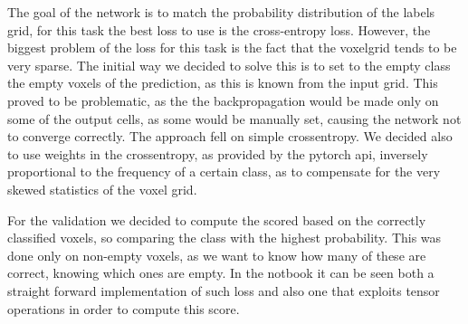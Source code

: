 The goal of the network is to match the probability distribution of the labels grid, for this task
the best loss to use is the cross-entropy loss. However, the biggest problem of the loss for this 
task is the fact that the voxelgrid tends to be very sparse. The initial way we decided to solve
this is to set to the empty class the empty voxels of the prediction, as this is known from the
input grid. This proved to be problematic, as the the backpropagation would be made only on some of
the output cells, as some would be manually set, causing the network not to converge correctly.
The approach fell on simple crossentropy. We decided also to use weights in the crossentropy, as
provided by the pytorch api, inversely proportional to the frequency of a certain class, as to
compensate for the very skewed statistics of the voxel grid.\par
For the validation we decided to compute the scored based on the correctly classified voxels, so 
comparing the class with the highest probability. This was done only on non-empty voxels, as we
want to know how many of these are correct, knowing which ones are empty. In the notbook it can
be seen both a straight forward implementation of such loss and also one that exploits tensor
operations in order to compute this score.
